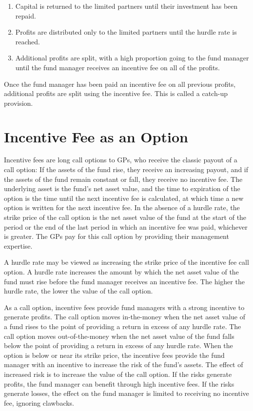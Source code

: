\documentclass[11pt]{article}
\begin{document}
\begin{enumerate}
  \item Capital is returned to the limited partners until their investment has been repaid.

  \item Profits are distributed only to the limited partners until the hurdle rate is reached.

  \item Additional profits are split, with a high proportion going to the fund manager until the fund manager receives an incentive fee on all of the profits.

\end{enumerate}

Once the fund manager has been paid an incentive fee on all previous profits, additional profits are split using the incentive fee. This is called a catch-up provision.

\section*{Incentive Fee as an Option}
Incentive fees are long call options to GPs, who receive the classic payout of a call option: If the assets of the fund rise, they receive an increasing payout, and if the assets of the fund remain constant or fall, they receive no incentive fee. The underlying asset is the fund's net asset value, and the time to expiration of the option is the time until the next incentive fee is calculated, at which time a new option is written for the next incentive fee. In the absence of a hurdle rate, the strike price of the call option is the net asset value of the fund at the start of the period or the end of the last period in which an incentive fee was paid, whichever is greater. The GPs pay for this call option by providing their management expertise.

A hurdle rate may be viewed as increasing the strike price of the incentive fee call option. A hurdle rate increases the amount by which the net asset value of the fund must rise before the fund manager receives an incentive fee. The higher the hurdle rate, the lower the value of the call option.

As a call option, incentive fees provide fund managers with a strong incentive to generate profits. The call option moves in-the-money when the net asset value of a fund rises to the point of providing a return in excess of any hurdle rate. The call option moves out-of-the-money when the net asset value of the fund falls below the point of providing a return in excess of any hurdle rate. When the option is below or near its strike price, the incentive fees provide the fund manager with an incentive to increase the risk of the fund's assets. The effect of increased risk is to increase the value of the call option. If the risks generate profits, the fund manager can benefit through high incentive fees. If the risks generate losses, the effect on the fund manager is limited to receiving no incentive fee, ignoring clawbacks.
\end{document}
